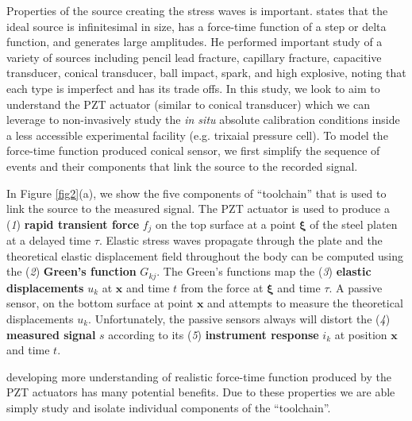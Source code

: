 \documentclass[preprint,3p, 11pt,authoryear]{elsarticle}
\begin{document}
Properties of the source creating the stress waves is important. \citet{Breckenridge1990} states that the ideal source is infinitesimal in size, has a force-time function of a step or delta function, and generates large amplitudes. He performed important study of a variety of sources including pencil lead fracture, capillary fracture, capacitive transducer, conical transducer, ball impact, spark, and high explosive, noting that each type is imperfect and has its trade offs. In this study, we look to aim to understand the PZT actuator (similar to conical transducer) which we can leverage to non-invasively study the \textit{in situ} absolute calibration conditions inside a less accessible experimental facility (e.g. trixaial pressure cell). To model the force-time function produced conical sensor, we first simplify the sequence of events and their components that link the source to the recorded signal.

In Figure \ref{fig2}(a), we show the five components of ``toolchain'' that is used to link the source to the measured signal. The PZT actuator is used to produce a (\textit{1}) \textbf{rapid transient force} $f_{j}$ on the top surface at a point $\mathbf{\xi}$ of the steel platen at a delayed time $\tau$. Elastic stress waves propagate through the plate and the theoretical elastic displacement field throughout the body can be computed using the (\textit{2}) \textbf{Green's function} $G_{kj}$. The Green's functions map the (\textit{3})\textbf{ elastic displacements} $u_{k}$ at $\mathbf{x}$ and time $t$ from the force at $\mathbf{\xi}$ and time $\tau$. A passive sensor, on the bottom surface at point $\mathbf{x}$ and attempts to measure the theoretical displacements $u_{k}$. Unfortunately, the passive sensors always will distort the (\textit{4}) \textbf{measured signal}  $s$ according to its (\textit{5}) \textbf{instrument response} $i_{k}$ at position $\mathbf{x}$ and time $t$.


developing more understanding of realistic force-time function produced by the PZT actuators has many potential benefits. Due to these properties we are able simply study and isolate individual components of the ``toolchain''. 
\end{document}
